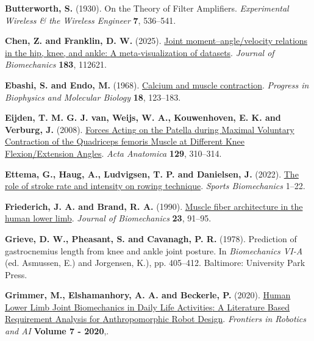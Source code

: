 \documentclass[
  11pt,
  a4paper]{article}
\newlength{\cslhangindent}
\newenvironment{CSLReferences}[2] %
 {\begin{list}{}{%
  \setlength{\itemindent}{0pt}
  \setlength{\leftmargin}{0pt}
  \setlength{\parsep}{0pt}
  \ifodd #1
   \setlength{\leftmargin}{\cslhangindent}
   \setlength{\itemindent}{-1\cslhangindent}
  \fi
  \setlength{\itemsep}{#2\baselineskip}}}
 {\end{list}}
\begin{document}
\begin{CSLReferences}{1}{1}
\textbf{Butterworth, S.} (1930). On the {Theory} of {Filter}
{Amplifiers}. \emph{Experimental Wireless \& the Wireless Engineer}
\textbf{7}, 536--541.

\textbf{Chen, Z. and Franklin, D. W.} (2025).
\href{https://doi.org/10.1016/j.jbiomech.2025.112621}{Joint
moment--angle/velocity relations in the hip, knee, and ankle: {A}
meta-visualization of datasets}. \emph{Journal of Biomechanics}
\textbf{183}, 112621.

\textbf{Ebashi, S. and Endo, M.} (1968).
\href{https://doi.org/10.1016/0079-6107(68)90023-0}{Calcium and muscle
contraction}. \emph{Progress in Biophysics and Molecular Biology}
\textbf{18}, 123--183.

\textbf{Eijden, T. M. G. J. van, Weijs, W. A., Kouwenhoven, E. K. and
Verburg, J.} (2008). \href{https://doi.org/10.1159/000146421}{Forces
{Acting} on the {Patella} during {Maximal} {Voluntary} {Contraction} of
the {Quadriceps} femoris {Muscle} at {Different} {Knee}
{Flexion}/{Extension} {Angles}}. \emph{Acta Anatomica} \textbf{129},
310--314.

\textbf{Ettema, G., Haug, A., Ludvigsen, T. P. and Danielsen, J.}
(2022). \href{https://doi.org/10.1080/14763141.2022.2135457}{The role of
stroke rate and intensity on rowing technique}. \emph{Sports
Biomechanics} 1--22.

\textbf{Friederich, J. A. and Brand, R. A.} (1990).
\href{https://doi.org/10.1016/0021-9290(90)90373-B}{Muscle fiber
architecture in the human lower limb}. \emph{Journal of Biomechanics}
\textbf{23}, 91--95.

\textbf{Grieve, D. W., Pheasant, S. and Cavanagh, P. R.} (1978).
Prediction of gastrocnemius length from knee and ankle joint posture. In
\emph{Biomechanics {VI}-{A}} (ed. Asmussen, E.) and Jorgensen, K.), pp.
405--412. Baltimore: University Park Press.

\textbf{Grimmer, M., Elshamanhory, A. A. and Beckerle, P.} (2020).
\href{https://www.frontiersin.org/journals/robotics-and-ai/articles/10.3389/frobt.2020.00013}{Human
{Lower} {Limb} {Joint} {Biomechanics} in {Daily} {Life} {Activities}:
{A} {Literature} {Based} {Requirement} {Analysis} for {Anthropomorphic}
{Robot} {Design}}. \emph{Frontiers in Robotics and AI} \textbf{Volume 7
- 2020},.


\end{CSLReferences}
\end{document}
